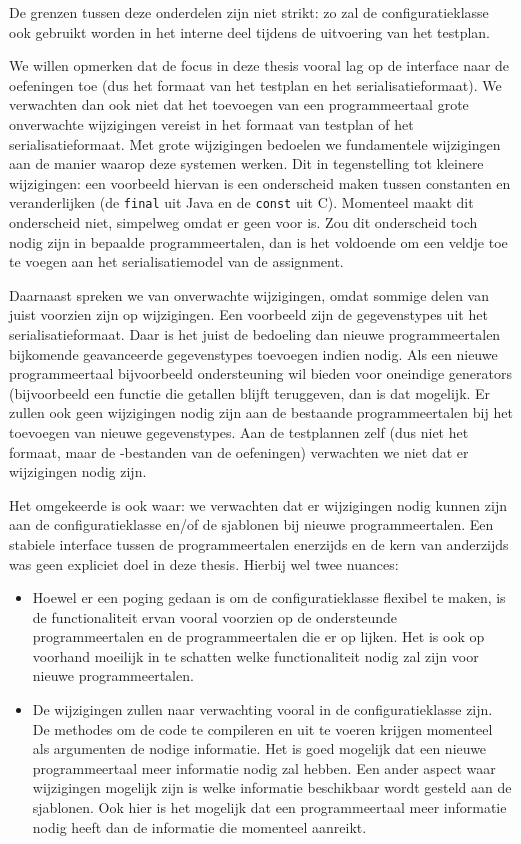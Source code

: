 De grenzen tussen deze onderdelen zijn niet strikt: zo zal de configuratieklasse ook gebruikt worden in het interne deel tijdens de uitvoering van het testplan.

We willen opmerken dat de focus in deze thesis vooral lag op de interface naar de oefeningen toe (dus het formaat van het testplan en het serialisatieformaat).
We verwachten dan ook niet dat het toevoegen van een programmeertaal grote onverwachte wijzigingen vereist in het formaat van testplan of het serialisatieformaat.
Met grote wijzigingen bedoelen we fundamentele wijzigingen aan de manier waarop deze systemen werken.
Dit in tegenstelling tot kleinere wijzigingen: een voorbeeld hiervan is een onderscheid maken tussen constanten en veranderlijken (de \texttt{final} uit Java en de \texttt{const} uit C).
Momenteel maakt \tested{} dit onderscheid niet, simpelweg omdat er geen  voor is.
Zou dit onderscheid toch nodig zijn in bepaalde programmeertalen, dan is het voldoende om een veldje toe te voegen aan het serialisatiemodel van de assignment.

Daarnaast spreken we van onverwachte wijzigingen, omdat sommige delen van \tested{} juist voorzien zijn op wijzigingen.
Een voorbeeld zijn de gegevenstypes uit het serialisatieformaat.
Daar is het juist de bedoeling dan nieuwe programmeertalen bijkomende geavanceerde gegevenstypes toevoegen indien nodig.
Als een nieuwe programmeertaal bijvoorbeeld ondersteuning wil bieden voor oneindige generators (bijvoorbeeld een functie die getallen blijft teruggeven, dan is dat mogelijk.
Er zullen ook geen wijzigingen nodig zijn aan de bestaande programmeertalen bij het toevoegen van nieuwe gegevenstypes.
Aan de testplannen zelf (dus niet het formaat, maar de -bestanden van de oefeningen) verwachten we niet dat er wijzigingen nodig zijn.

Het omgekeerde is ook waar: we verwachten dat er wijzigingen nodig kunnen zijn aan de configuratieklasse en/of de sjablonen bij nieuwe programmeertalen.
Een stabiele interface tussen de programmeertalen enerzijds en de kern van \tested{} anderzijds was geen expliciet doel in deze thesis.
Hierbij wel twee nuances:

\begin{itemize}
    \item Hoewel er een poging gedaan is om de configuratieklasse flexibel te maken, is de functionaliteit ervan vooral voorzien op de ondersteunde programmeertalen en de programmeertalen die er op lijken.
    Het is ook op voorhand moeilijk in te schatten welke functionaliteit nodig zal zijn voor nieuwe programmeertalen.
    \item De wijzigingen zullen naar verwachting vooral in de configuratieklasse zijn.
    De methodes om de code te compileren en uit te voeren krijgen momenteel als argumenten de nodige informatie.
    Het is goed mogelijk dat een nieuwe programmeertaal meer informatie nodig zal hebben.
    Een ander aspect waar wijzigingen mogelijk zijn is welke informatie beschikbaar wordt gesteld aan de sjablonen.
    Ook hier is het mogelijk dat een programmeertaal meer informatie nodig heeft dan de informatie die \tested{} momenteel aanreikt.
\end{itemize}

